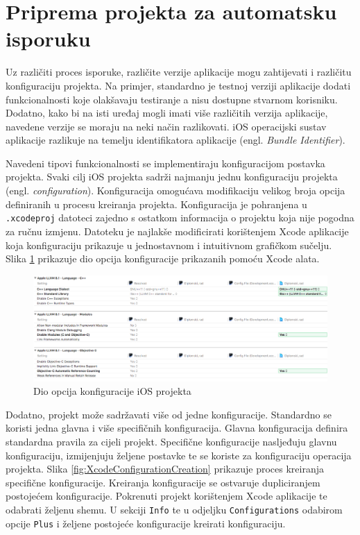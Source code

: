\documentclass[times, utf8, diplomski, numeric]{fer}
\newcommand{\eng}[1]{(engl. \textit{#1})}
\begin{document}
\section{Priprema projekta za automatsku isporuku}

Uz različiti proces isporuke, različite verzije aplikacije mogu zahtijevati i različitu konfiguraciju projekta. Na primjer, standardno je testnoj verziji aplikacije dodati funkcionalnosti koje olakšavaju testiranje a nisu dostupne stvarnom korisniku. Dodatno, kako bi na isti uređaj mogli imati više različitih verzija aplikacije, navedene verzije se moraju na neki način razlikovati. iOS operacijski sustav aplikacije razlikuje na temelju identifikatora aplikacije \eng{Bundle Identifier}.

Navedeni tipovi funkcionalnosti se implementiraju konfiguracijom postavka projekta. Svaki cilj iOS projekta sadrži najmanju jednu konfiguraciju projekta \eng{configuration}. Konfiguracija omogućava modifikaciju velikog broja opcija definiranih u procesu kreiranja projekta. Konfiguracija je pohranjena u \verb|.xcodeproj| datoteci zajedno s ostatkom informacija o projektu koja nije pogodna za ručnu izmjenu. Datoteku je najlakše modificirati korištenjem Xcode aplikacije koja konfiguraciju prikazuje u jednostavnom i intuitivnom grafičkom sučelju. Slika \ref{fig:XcodeConfiguration} prikazuje dio opcija konfiguracije prikazanih pomoću Xcode alata.

\begin{figure}
\centering
\includegraphics[scale=0.37]{XcodeConfiguration}
\caption{Dio opcija konfiguracije iOS projekta}
\label{fig:XcodeConfiguration}
\end{figure}

Dodatno, projekt može sadržavati više od jedne konfiguracije. Standardno se koristi jedna glavna i više specifičnih konfiguracija. Glavna konfiguracija definira standardna pravila za cijeli projekt. Specifične konfiguracije nasljeđuju glavnu konfiguraciju, izmijenjuju željene postavke te se koriste za konfiguraciju operacija projekta. Slika \ref{fig:XcodeConfigurationCreation} prikazuje proces kreiranja specifične konfiguracije. Kreiranja konfiguracije se ostvaruje dupliciranjem postojećem konfiguracije. Pokrenuti projekt korištenjem Xcode aplikacije te odabrati željenu shemu. U sekciji \verb|Info| te u odjeljku \verb|Configurations| odabirom opcije \verb|Plus| i željene postojeće konfiguracije kreirati konfiguraciju.
\end{document}
